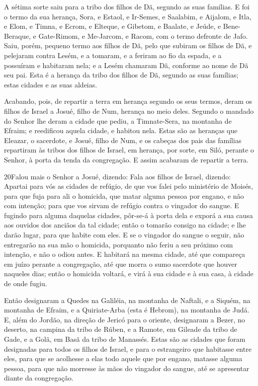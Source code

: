 A sétima sorte saiu para a tribo dos filhos de Dã, segundo as
suas famílias. E foi o termo da sua herança, Sora, e Estaol,
e Ir-Semes, e Saalabim, e Aijalom, e Itla, e Elom, e
Timna, e Ecrom, e Elteque, e Gibetom, e Baalate, e
Jeúde, e Bene-Beraque, e Gate-Rimom, e Me-Jarcom, e Racom,
com o termo defronte de Jafo. Saiu, porém, pequeno termo aos
filhos de Dã, pelo que subiram os filhos de Dã, e pelejaram contra
Lesém, e a tomaram, e a feriram ao fio da espada, e a possuíram e
habitaram nela; e a Lesém chamaram Dã, conforme ao nome de Dã seu
pai. Esta é a herança da tribo dos filhos de Dã, segundo as
suas famílias; estas cidades e as suas aldeias.

Acabando, pois, de repartir a terra em herança segundo os seus
termos, deram os filhos de Israel a Josué, filho de Num, herança no
meio deles. Segundo o mandado do Senhor lhe deram a cidade
que pediu, a Timnate-Sera, na montanha de Efraim; e reedificou
aquela cidade, e habitou nela. Estas são as heranças que
Eleazar, o sacerdote, e Josué, filho de Num, e os cabeças dos pais
das famílias repartiram às tribos dos filhos de Israel, em herança,
por sorte, em Siló, perante o Senhor, à porta da tenda da
congregação. E assim acabaram de repartir a terra.

\medskip

\lettrine{20} Falou mais o Senhor a Josué, dizendo: Fala
aos filhos de Israel, dizendo: Apartai para vós as cidades de
refúgio, de que vos falei pelo ministério de Moisés, para que
fuja para ali o homicida, que matar alguma pessoa por engano, e não
com intenção; para que vos sirvam de refúgio contra o vingador do
sangue. E fugindo para alguma daquelas cidades, pôr-se-á à porta
dela e exporá a sua causa aos ouvidos dos anciãos da tal cidade;
então o tomarão consigo na cidade; e lhe darão lugar, para que
habite com eles. E se o vingador do sangue o seguir, não
entregarão na sua mão o homicida, porquanto não feriu a seu próximo
com intenção, e não o odiou antes. E habitará na mesma cidade,
até que compareça em juízo perante a congregação, até que morra o
sumo sacerdote que houver naqueles dias; então o homicida voltará, e
virá à sua cidade e à sua casa, à cidade de onde fugiu.

Então designaram a Quedes na Galiléia, na montanha de Naftali, e a
Siquém, na montanha de Efraim, e a Quiriate-Arba (esta é Hebrom), na
montanha de Judá. E, além do Jordão, na direção de Jericó para o
oriente, designaram a Bezer, no deserto, na campina da tribo de
Rúben, e a Ramote, em Gileade da tribo de Gade, e a Golã, em Basã da
tribo de Manassés. Estas são as cidades que foram designadas
para todos os filhos de Israel, e para o estrangeiro que habitasse
entre eles, para que se acolhesse a elas todo aquele que por engano,
matasse alguma pessoa, para que não morresse às mãos do vingador do
sangue, até se apresentar diante da congregação.

